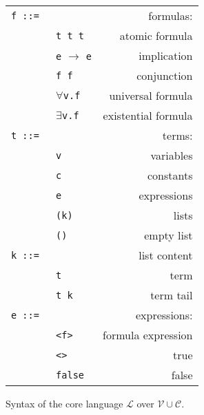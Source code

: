 \begin{figure}
\centering \small
\begin{tabular}{llr}
\hline
\texttt{f ::= } & &                   formulas:\\  
    &  \texttt{t t t}&                atomic formula\\
    &  \texttt{e} $\rightarrow$ \texttt{e}& implication\\
    &  \texttt{f f} &                 conjunction\\
    &  \(\forall\)\texttt{v.f}     & universal formula\\
    &  \(\exists\)\texttt{v.f}     & existential formula\\
\texttt{t ::=}&&                    terms:\\
      & \texttt{v}\hspace{0.3\textwidth} &                variables\\
      & \texttt{c} &                constants\\
      & \texttt{e} &                 expressions\\
      & \texttt{(k)}& lists\\
      & \texttt{()}& empty list\\
\texttt{k ::=}&&                    list content\\  
       &\texttt{t}  &term\\
       &\texttt{t k}&term tail\\
\texttt{e ::=}&&                    expressions:\\
       &\texttt{<f>} &               formula expression\\
       &\texttt{<>} & true\\
       &\texttt{false}       &               false\\
    \hline
\end{tabular}
\caption{Syntax of the core language $\mathcal{L}$ over $\mathcal{V}\cup\mathcal{C}$.\label{syntax}}
\end{figure}

